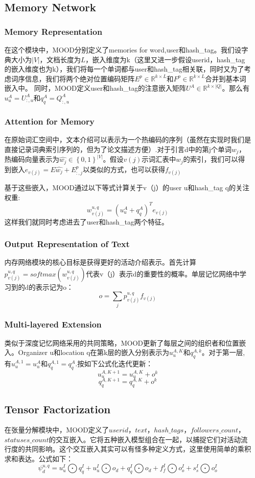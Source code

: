 \documentclass[a4paper, 12pt]{ctexart}
\begin{document}
\subsection{Memory Network}
\subsubsection{Memory Representation}
在这个模块中，MOOD分别定义了memories for word,user和hash\_tag。我们设字典大小为$|V|$，文档长度为$L$，嵌入维度为k（这里又进一步假设userid，hash\_tag的嵌入维度也为k），我们将每一个单词都与user和hash\_tag相关联，同时又为了考虑词序信息，我们将两个绝对位置编码矩阵$E^p \in \mathbb{R}^{k\times L}$和$F^p \in \mathbb{R}^{k \times L}$合并到基本词嵌入中。
同时，MOOD定义user和hash\_tag的注意嵌入矩阵$U^A \in \mathbb{R}^{k\times\left| Q \right|}$。那么有$u_u^A=U_{:,u}^A$和$q_q^A=Q_{:,u}^A$
\subsubsection{Attention for Memory}
在原始词汇空间中，文本介绍可以表示为一个热编码的序列（虽然在实现时我们是直接记录词典索引序列的，但为了论文描述方便）.对于引言d中的第j个单词$w_j$，热编码向量表示为$\hat{w_j} \in \left\{  0,1\right\}^ {\left| V \right|} $。假设$v(j)$示词汇表中$w_j$的索引，我们可以得到嵌入$e_{v(j)}=E\hat{w_j}+E_{:,j}^p$以类似的方式，也可以获得$f_{v(j)}$

基于这些嵌入，MOOD通过以下等式计算关于v（j）的user u和hash\_tag q的关注权重:
\[w_{v(j)}^{u,q}=(u_u^A+q_q^A)^Te_{v(j)}\]
这样我们就同时考虑进去了user和hash\_tag两个特征。
\subsubsection{Output Representation of Text}
内存网络模块的核心目标是获得更好的活动介绍表示。首先计算$p_{v(j)}^{u,q}=softmax(w_{v(j)}^{u,q})$代表v（j）表示d的重要性的概率。单层记忆网络中学习到的d的表示记为o：
\[o= \sum_{j}p_{v(j)}^{u,q}f_{v(j)}\]
\subsubsection{Multi-layered Extension}
类似于深度记忆网络采用的共同策略，MOOD更新了每层之间的组织者和位置嵌入。Organizer u和location q在第k层的嵌入分别表示为$u_u^{A,K}$和$q_q^{A,k}$。对于第一层,有$u_u^{A,1}=u_u^A$和$q_q^{A,1} = q_q^{A}$.按如下公式化迭代更新：
\[u_u^{A,K+1}=u_u^{A,K}+o^k\]
\[q_q^{A,K+1}=q_q^{A,K}+o^k\]

\subsection{Tensor Factorization}
在张量分解模块中，MOOD定义了$userid$，$text$，$hash\_tags$，$followers\_count$，$statuses\_count$的交互嵌入。它将五种嵌入模型组合在一起，以捕捉它们对活动流行度的共同影响。这个交互嵌入其实可以有怪多种定义方式，这里使用简单的乘积求和表达。公式如下：
\[\psi_d^{u,q}=u_u^{I} \bigodot q_q^{I}+u_u^{I} \bigodot o_d+q_q^{I} \bigodot o_d+f_f^{I} \bigodot o_o^{I}+s_s^{I} \bigodot o_o^{I}\]
\end{document}

